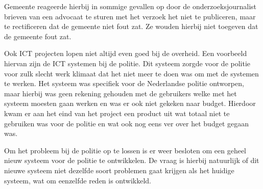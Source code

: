 Gemeente reageerde hierbij in sommige gevallen op door de onderzoeksjournalist brieven van een advocaat te sturen met het verzoek het niet te publiceren, maar te rectificeren dat de gemeente niet fout zat. Ze wouden hierbij niet toegeven dat de gemeente fout zat.

Ook ICT projecten lopen niet altijd even goed bij de overheid. Een voorbeeld hiervan zijn de ICT systemen bij de politie\cite{bib.tweakers.politie}. Dit systeem zorgde voor de politie voor zulk slecht werk klimaat dat het niet meer te doen was om met de systemen te werken. Het systeem was specifiek voor de Nederlandse politie ontworpen, maar hierbij was geen rekening gehouden met de gebruikers welke met het systeem moesten gaan werken en was er ook niet gekeken naar budget. Hierdoor kwam er aan het eind van het project een product uit wat totaal niet te gebruiken was voor de politie en wat ook nog eens ver over het budget gegaan was. 

Om het probleem bij de politie op te lossen is er weer besloten om een geheel nieuw systeem voor de politie te ontwikkelen. De vraag is hierbij natuurlijk of dit nieuwe systeem niet dezelfde soort problemen gaat krijgen als het huidige systeem, wat om eenzelfde reden is ontwikkeld.


